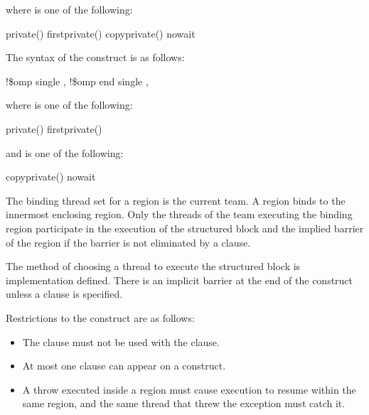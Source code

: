 \begin{samepage}
where  is one of the following:

\begin{indentedcodelist}
private()
firstprivate()
copyprivate()
nowait
\end{indentedcodelist}
\ccppspecificend
\end{samepage}

\fortranspecificstart
The syntax of the  construct is as follows:

\begin{boxedcode}
!\$omp single \plc{[clause[ [},\plc{] clause] ... ]}
!\$omp end single \plc{[end\_clause[ [},\plc{] end\_clause] ... ]}
\end{boxedcode}

where  is one of the following:

\begin{indentedcodelist}
private()
firstprivate()
\end{indentedcodelist}

and  is one of the following: 

\begin{indentedcodelist}
copyprivate()
nowait
\end{indentedcodelist}
\fortranspecificend

\binding
The binding thread set for a  region is the current team. A  region 
binds to the innermost enclosing  region. Only the threads of the team 
executing the binding  region participate in the execution of the structured 
block and the implied barrier of the  region if the barrier is not eliminated by a 
 clause.

\descr
The method of choosing a thread to execute the structured block is implementation 
defined. There is an implicit barrier at the end of the  construct unless a 
 clause is specified. 

\restrictions
Restrictions to the  construct are as follows: 

\begin{itemize}
\item The  clause must not be used with the  clause.

\item At most one  clause can appear on a  construct.

\cppspecificstart
\item A throw executed inside a  region must cause execution to resume within the 
same  region, and the same thread that threw the exception must catch it.
\cppspecificend
\end{itemize}


